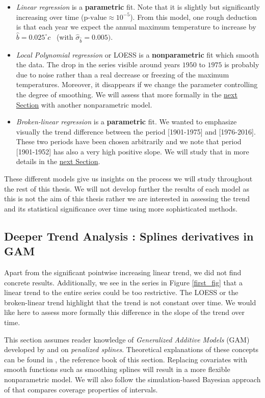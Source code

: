 \begin{itemize}
\item \emph{Linear regression} is a \textbf{parametric} fit. Note that it is slightly but significantly increasing over time ($\text{p-value}\approx 10^{-5}$). From this model, one rough deduction is that each year we expect the annual maximum temperature to increase by $\hat{b}=0.025^{\circ}c$ \  (with $\hat{\sigma}_{\hat{b}}=0.005)$.

\item \emph{Local Polynomial regression } or LOESS is a \textbf{nonparametric} fit which smooth the data. The drop in the series visible around years $1950$ to $1975$ is probably due to noise rather than a real decrease or freezing of the maximum temperatures. Moreover, it disappears if we change the parameter controlling the degree of smoothing. We will assess that more formally in the \hyperref[sec:splines]{next Section} with another nonparametric model.

\item \emph{Broken-linear regression} is a \textbf{parametric} fit. We wanted to emphasize visually the trend difference between the period [1901-1975] and [1976-2016]. These two periods have been chosen arbitrarily and we note that period [1901-1952] has also a very high positive slope. We will study that in more details in the \hyperref[sec:splines]{next Section}.
\end{itemize}
These different models give us insights on the process we will study throughout the rest of this thesis. We will not develop further the results of each model as this is not the aim of this thesis rather we are interested in assessing the trend and its statistical significance over time using more sophisticated methods.


\subsection{Deeper Trend Analysis : Splines derivatives in GAM}\label{sec:splines}

Apart from the significant pointwise increasing linear trend, we did not find concrete results. Additionally, we see in the series in Figure \ref{first_fig} that a linear trend to the entire series could be too restrictive. The LOESS or the broken-linear trend highlight that the trend is not constant over time.
We would like here to assess more formally this difference in the slope of the trend over time. 

This section assumes reader knowledge of \emph{Generalized Additive Models} (GAM) developed by \citet{hastie_generalized_1986} and on \emph{penalized splines}. Theoretical explanations of these concepts can be found in \citet[chapter 3, 6 and 11]{ruppert_semiparametric_2003}, the reference book of this section. Replacing covariates with smooth functions such as smoothing splines will result in a more flexible nonparametric model. We will also follow the simulation-based Bayesian approach of \citet{marra_coverage_2012} that compares coverage properties of intervals.


